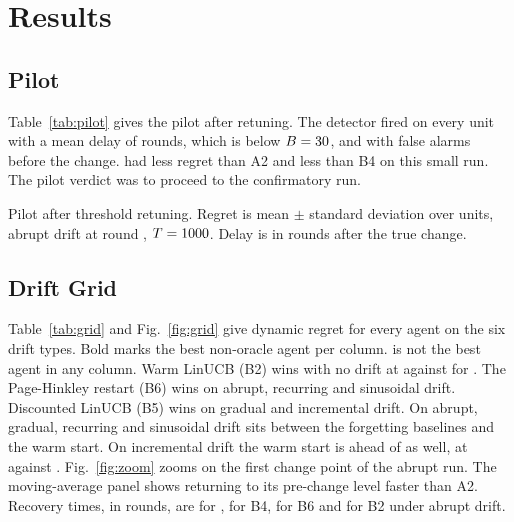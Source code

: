 \section{Results}
\label{sec:results}

\subsection{Pilot}
Table~\ref{tab:pilot} gives the pilot after retuning. The detector fired on every unit with a mean delay of \pilotDelay{} rounds, which is below $B=30$, and with \pilotFalseAlarms{} false alarms before the change. \des{} had \pilotDESminusAtwo{} less regret than A2 and \pilotDESminusBfour{} less than B4 on this small run. The pilot verdict was to proceed to the confirmatory run.

\begin{table}[t]
\centering
\caption{Pilot after threshold retuning. Regret is mean $\pm$ standard deviation over \pilotUnits{} units, abrupt drift at round \expPilotChangePoint, $T=\expPilotT$. Delay is in rounds after the true change.}
\label{tab:pilot}
\small
\begin{adjustbox}{max width=\columnwidth}

\end{adjustbox}
\end{table}

\subsection{Drift Grid}
Table~\ref{tab:grid} and Fig.~\ref{fig:grid} give dynamic regret for every agent on the six drift types. Bold marks the best non-oracle agent per column. \des{} is not the best agent in any column. Warm LinUCB (B2) wins with no drift at \gridNoneBTwo{} against \gridNoneDES{} for \des{}. The Page-Hinkley restart (B6) wins on abrupt, recurring and sinusoidal drift. Discounted LinUCB (B5) wins on gradual and incremental drift. On abrupt, gradual, recurring and sinusoidal drift \des{} sits between the forgetting baselines and the warm start. On incremental drift the warm start is ahead of \des{} as well, at \gridIncrementalBTwo{} against \gridIncrementalDES. Fig.~\ref{fig:zoom} zooms on the first change point of the abrupt run. The moving-average panel shows \des{} returning to its pre-change level faster than A2. Recovery times, in rounds, are \recoveryAbruptDES{} for \des{}, \recoveryAbruptBFour{} for B4, \recoveryAbruptBSix{} for B6 and \recoveryAbruptBTwo{} for B2 under abrupt drift.

